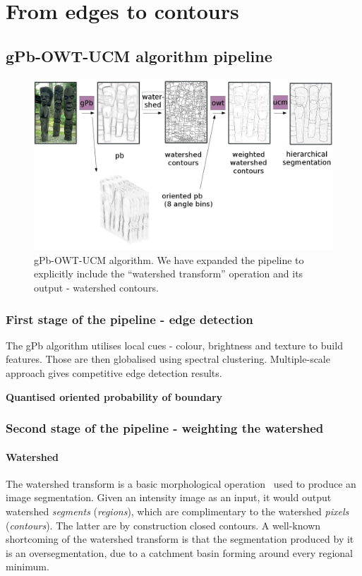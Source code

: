 \chapter{From edges to contours} %
\label{Chapter3}

\section{gPb-OWT-UCM algorithm pipeline}
\begin{figure}[ht!]
\centering
 \includegraphics[width=1\textwidth]{images/gPb-OWT-UCM/gPb-OWT-UCM_pipeline.png}
\caption{gPb-OWT-UCM algorithm. We have expanded the pipeline to explicitly include the ``watershed transform'' operation and its output - watershed contours.}
\label{fig:gPb-OWT-UCM-pipeline}
\end{figure}

\subsection{First stage of the pipeline - edge detection} %
The gPb algorithm utilises local cues - colour, brightness and texture to build features. Those are then globalised using spectral clustering. Multiple-scale approach gives competitive edge detection results.

\textbf{Quantised oriented probability of boundary}
\subsection{Second stage of the pipeline - weighting the watershed} %
\subsubsection{Watershed}
\label{sec:ch3-watershed}
The watershed transform is a basic morphological operation~\cite{beucher1992morphological} used to produce an image segmentation. Given an intensity %
image as an input, it would output watershed \textit{segments} (\textit{regions}), which are complimentary to the watershed \textit{pixels} (\textit{contours}). The latter are by construction closed contours. A well-known shortcoming of the watershed transform is that the 
segmentation produced by it is an oversegmentation, due to a catchment basin forming around every regional minimum.

